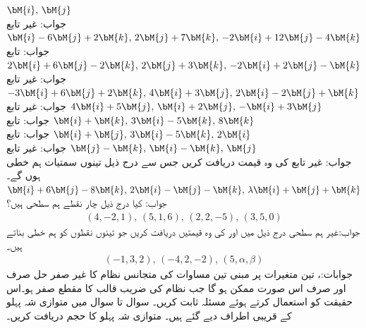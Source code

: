 \quad
$\bM{i},\, \bM{j}$\\
جواب: غیر تابع
\quad
$\bM{i}-6\bM{j}+2\bM{k},\, 2\bM{j}+7\bM{k},\, -2\bM{i}+12\bM{j}-4\bM{k}$\\
جواب: تابع
\quad
$2\bM{i}+6\bM{j}-2\bM{k},\, 2\bM{j}+3\bM{k},\, -2\bM{i}+2\bM{j}-\bM{k}$\\
جواب: غیر تابع
\quad
$-3\bM{i}+6\bM{j}+2\bM{k},\, 4\bM{i}+3\bM{j},\, 2\bM{i}-2\bM{j}+\bM{k}$\\
جواب: غیر تابع
\quad
$4\bM{i}+5\bM{j},\, \bM{i}+2\bM{j},\, -\bM{i}+3\bM{j}$\\
جواب: تابع
\quad
$\bM{i}+\bM{k},\, 3\bM{i}-5\bM{k},\, 8\bM{k}$\\
جواب: تابع
\quad
$\bM{i}+\bM{j},\, 3\bM{i}-5\bM{k},\, 2\bM{i}$\\
جواب: غیر تابع
\quad
$\bM{j}-\bM{k},\, \bM{i}-\bM{k},\, \bM{j}$\\
جواب: غیر تابع
\quad
{} کی وہ قیمت دریافت کریں جس سے درج ذیل تینوں سمتیات ہم خطی ہوں گے۔\\
$\bM{i}+6\bM{j}-8\bM{k},\, 2\bM{i}-\bM{j}-\bM{k},\, \lambda\bM{i}+\bM{j}+\bM{k}$\\
جواب:
کیا درج ذیل چار نقطے ہم سطحی ہیں؟
\begin{align*}
(4,-2,1),\,(5,1,6),\,(2,2,-5),\,(3,5,0)
\end{align*}
جواب:غیر ہم سطحی
درج ذیل میں  اور  کی وہ قیمتیں دریافت کریں جو تینوں نقطوں کو ہم خطی بناتے ہیں۔
\begin{align*}
(-1,3,2),\, (-4,2,-2),\, (5,\alpha,\beta)
\end{align*}
جوابات:، 
تین متغیرات پر مبنی تین مساوات کی متجانس نظام کا غیر صفر حل صرف اور صرف اس صورت ممکن ہو گا جب نظام کی  ضریب  قالب کا مقطع صفر ہو۔اس حقیقت کو استعمال کرتے ہوئے مسئلہ  ثابت کریں۔ 
سوال  تا سوال  میں متوازی شہ پہلو کے قریبی اطراف دیے گئے ہیں۔ متوازی شہ پہلو کا حجم دریافت کریں۔

